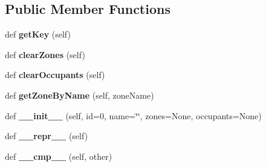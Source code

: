 \subsection*{Public Member Functions}
\begin{DoxyCompactItemize}
\item 
\mbox{\label{class_c_simulation_1_1_simulation_1_1_building_a005f8f2d5acfee7d24d1aac6005a1e0a}} 
def {\bfseries get\+Key} (self)
\item 
\mbox{\label{class_c_simulation_1_1_simulation_1_1_building_a0c6ebeeeab67ba9a1868291123bc484f}} 
def {\bfseries clear\+Zones} (self)
\item 
\mbox{\label{class_c_simulation_1_1_simulation_1_1_building_a0cddba616803a5265a0c765be092ed95}} 
def {\bfseries clear\+Occupants} (self)
\item 
\mbox{\label{class_c_simulation_1_1_simulation_1_1_building_ab6b246e5565eb24f051005f6f483bc2a}} 
def {\bfseries get\+Zone\+By\+Name} (self, zone\+Name)
\item 
\mbox{\label{class_c_simulation_1_1_simulation_1_1_building_af7078bbb194f02b25eda963059d3a896}} 
def {\bfseries \+\_\+\+\_\+init\+\_\+\+\_\+} (self, id=0, name=\char`\"{}\char`\"{}, zones=None, occupants=None)
\item 
\mbox{\label{class_c_simulation_1_1_simulation_1_1_building_a9a47563093dfc5ba12274b66e368920c}} 
def {\bfseries \+\_\+\+\_\+repr\+\_\+\+\_\+} (self)
\item 
\mbox{\label{class_c_simulation_1_1_simulation_1_1_building_a157f9a5d3230b5fbbcb1391575ca1662}} 
def {\bfseries \+\_\+\+\_\+cmp\+\_\+\+\_\+} (self, other)
\end{DoxyCompactItemize}
